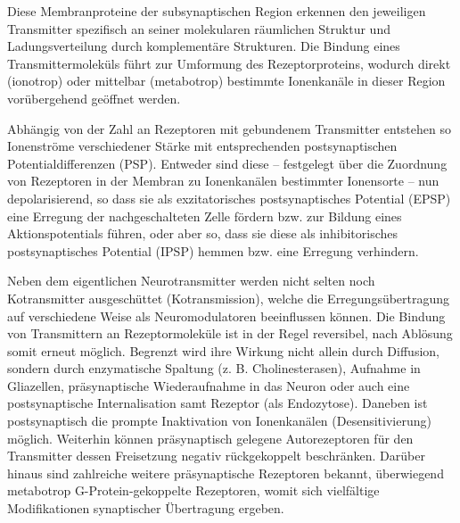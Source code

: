 Diese Membranproteine der subsynaptischen Region erkennen den jeweiligen Transmitter spezifisch an seiner molekularen räumlichen Struktur und Ladungsverteilung durch komplementäre Strukturen. Die Bindung eines Transmittermoleküls führt zur Umformung des Rezeptorproteins, wodurch direkt (ionotrop) oder mittelbar (metabotrop) bestimmte Ionenkanäle in dieser Region vorübergehend geöffnet werden.

Abhängig von der Zahl an Rezeptoren mit gebundenem Transmitter entstehen so Ionenströme verschiedener Stärke mit entsprechenden postsynaptischen Potentialdifferenzen (PSP). Entweder sind diese – festgelegt über die Zuordnung von Rezeptoren in der Membran zu Ionenkanälen bestimmter Ionensorte – nun depolarisierend, so dass sie als exzitatorisches postsynaptisches Potential (EPSP) eine Erregung der nachgeschalteten Zelle fördern bzw. zur Bildung eines Aktionspotentials führen, oder aber so, dass sie diese als inhibitorisches postsynaptisches Potential (IPSP) hemmen bzw. eine Erregung verhindern.

Neben dem eigentlichen Neurotransmitter werden nicht selten noch Kotransmitter ausgeschüttet (Kotransmission), welche die Erregungsübertragung auf verschiedene Weise als Neuromodulatoren beeinflussen können. Die Bindung von Transmittern an Rezeptormoleküle ist in der Regel reversibel, nach Ablösung somit erneut möglich. Begrenzt wird ihre Wirkung nicht allein durch Diffusion, sondern durch enzymatische Spaltung (z. B. Cholinesterasen), Aufnahme in Gliazellen, präsynaptische Wiederaufnahme in das Neuron oder auch eine postsynaptische Internalisation samt Rezeptor (als Endozytose). Daneben ist postsynaptisch die prompte Inaktivation von Ionenkanälen (Desensitivierung) möglich. Weiterhin können präsynaptisch gelegene Autorezeptoren für den Transmitter dessen Freisetzung negativ rückgekoppelt beschränken. Darüber hinaus sind zahlreiche weitere präsynaptische Rezeptoren bekannt, überwiegend metabotrop G-Protein-gekoppelte Rezeptoren, womit sich vielfältige Modifikationen synaptischer Übertragung ergeben.


